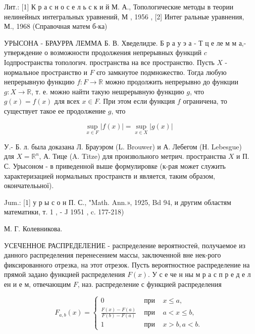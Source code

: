 \documentclass[10pt]{article}
\begin{document}
Лит.: [1] К р а с н о с е л ь с к и й М. А., Топологические методы в теории нелинейных интегральных уравнений, М , 1956 , [2] Интег ральные уравнения, М., 1968 (Справочная матем б-ка)



УРЫСОНА - БРАУРРА ЛЕММА Б. В. Хведелидзе. Б р а у э а - Т ц е ле м м а,- утверждение о возможности продолжения непрерывных функций $c$ Іодпространства топологич. пространства на все пространство. Пусть $X$ - нормальное пространство и $F$ єго замкнутое подмножество. Тогда любую непрерывную функцию $f: F \rightarrow \mathbb{R}$ можно продолжить непрерывно до функции $g: X \rightarrow \mathbb{R}$, т. е. можно найти такую нешрерывную функцию $g$, что $g(x)=f(x)$ для всех $x \in F$. При этом если функция $f$ ограничена, то существует такое ее продолжение $g$, что



\[

\sup _{x \in F}|f(x)|=\sup _{x \in X}|g(x)|

\]



У.- Б. л. была доказана Л. Брауэром (L. Brouwer) и А. Лебегом (Н. Lebesgue) для $X=\mathbb{R}^{n}$, А. Тице (A. Titze) для произвольного метрич. пространства $X$ и П. С. Урысоном - в приведенной выше формулировке (к-рая может служить характеризацией нормальных пространств и является, таким образом, окончателььної).



Jum.: [1] у р ы с о н П. С., "Math. Ann.», 1925, Bd 94, и другим областям математики, т. 1 , - J 1951 , c. 177-218)



М. Г. Колевникова.



УСЕЧЕННОЕ РАСПРЕДЕЛЕНИЕ - распределение вероятностеӥ, получаемое из данного распределения перенесением массы, заключенной вне нек-рого фиксированного отрезка, на этот отрезок. Пусть вероятностное распределение на прямой задано функцией распределения $F(x)$. У с е че н ны м р а с п р е д е л ен и е м, отвечающим $F$, наз. распределение с функцией распределения



\[

F_{a, b}(x)=\left\{\begin{array}{cll}

0 & \text { при } & x \leqslant a, \\

\frac{F(x)-F(a)}{F(b)-F(a)} & \text { при } & a<x \leqslant b, \\

1 & \text { при } & x>b, a<b .

\end{array}\right.

\]
\end{document}
